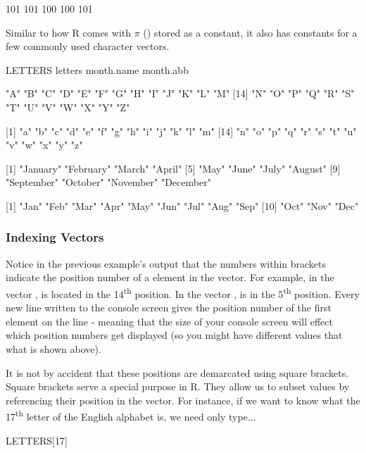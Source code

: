 \begin{outR}
[1] 101 101 100 100 101
\end{outR}

Similar to how R comes with $\pi$ () stored as a constant, it also has constants for a few commonly used character vectors.

\begin{inR}
LETTERS
letters
month.name
month.abb
\end{inR}

\begin{outR}
 [1] "A" "B" "C" "D" "E" "F" "G" "H" "I" "J" "K" "L" "M"
[14] "N" "O" "P" "Q" "R" "S" "T" "U" "V" "W" "X" "Y" "Z"

 [1] "a" "b" "c" "d" "e" "f" "g" "h" "i" "j" "k" "l" "m"
[14] "n" "o" "p" "q" "r" "s" "t" "u" "v" "w" "x" "y" "z"

 [1] "January"   "February"  "March"     "April"    
 [5] "May"       "June"      "July"      "August"   
 [9] "September" "October"   "November"  "December" 
 
 [1] "Jan" "Feb" "Mar" "Apr" "May" "Jun" "Jul" "Aug" "Sep"
[10] "Oct" "Nov" "Dec"
\end{outR}

\subsubsection{Indexing Vectors}
\label{sec:vectIndex}

Notice in the previous example's output that the numbers within brackets indicate the position number of a element in the vector.  For example, in the vector ,  is located in the 14\textsuperscript{th} position.  In the vector ,   is in the 5\textsuperscript{th} position. Every new line written to the console screen gives the position number of the first element on the line - meaning that the size of your console screen will effect which position numbers get displayed (so you might have different values that what is shown above).

It is not by accident that these positions are demarcated using square brackets.  Square brackets serve a special purpose in R.  They allow us to subset values by referencing their position in the vector.  For instance, if we want to know what the 17\textsuperscript{th} letter of the English alphabet is, we need only type...

\begin{inR}
LETTERS[17]
\end{inR}

